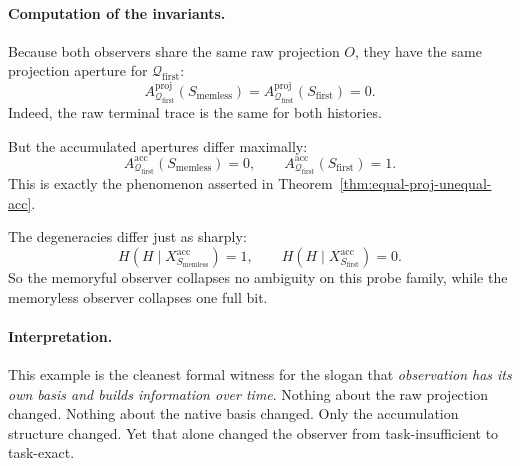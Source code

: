 \documentclass[11pt,twoside]{article}
\theoremstyle{definition}
\newcommand{\proj}{\mathrm{proj}}
\newcommand{\acc}{\mathrm{acc}}
\begin{document}
\paragraph{Computation of the invariants.}
Because both observers share the same raw projection \(O\), they have the same projection aperture for \(\mathcal{Q}_{\mathrm{first}}\):
\[
  A^{\proj}_{\mathcal{Q}_{\mathrm{first}}}(S_{\mathrm{memless}})
  =
  A^{\proj}_{\mathcal{Q}_{\mathrm{first}}}(S_{\mathrm{first}})
  =
  0.
\]
Indeed, the raw terminal trace is the same for both histories.

But the accumulated apertures differ maximally:
\[
  A^{\acc}_{\mathcal{Q}_{\mathrm{first}}}(S_{\mathrm{memless}})=0,
  \qquad
  A^{\acc}_{\mathcal{Q}_{\mathrm{first}}}(S_{\mathrm{first}})=1.
\]
This is exactly the phenomenon asserted in Theorem~\ref{thm:equal-proj-unequal-acc}.

The degeneracies differ just as sharply:
\[
  H(H\mid X_{S_{\mathrm{memless}}}^{\acc})=1,
  \qquad
  H(H\mid X_{S_{\mathrm{first}}}^{\acc})=0.
\]
So the memoryful observer collapses no ambiguity on this probe family, while the memoryless observer collapses one full bit.

\paragraph{Interpretation.}
This example is the cleanest formal witness for the slogan that \emph{observation has its own basis and builds information over time}. Nothing about the raw projection changed. Nothing about the native basis changed. Only the accumulation structure changed. Yet that alone changed the observer from task-insufficient to task-exact.
\end{document}
